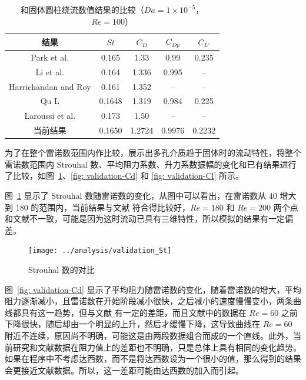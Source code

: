 \begin{table}[ht]
	\caption{和固体圆柱绕流数值结果的比较（$Da=1\times 10^{-5}$，$Re=100$）}
	\label{tab: validation}
	\vspace{.5em}\centering\wuhao
	\begin{tabular}{*{5}{c}}
		\toprule[1.5pt]
		结果 & $St$ & $C_D$ & $C_{Dp}$ & $C_{L'}$ \\
		\midrule[1pt]
		Park et al. \inlinecite{Park1998} & 0.165 & 1.33 & 0.99 & 0.235 \\
		Li et al. \inlinecite{Li2009} & 0.164 & 1.336 & 0.995 & -- \\
		Harrichandan and Roy \inlinecite{Harichandan2010} & 0.161 & 1.352 & -- & -- \\
		Qu L \inlinecite{Qu2013} & 0.1648 & 1.319 & 0.984 & 0.225 \\
		Laroussi et al. \inlinecite{Laroussi2014} & 0.173 & 1.50 & -- & -- \\
		当前结果 & 0.1650 & 1.2724 & 0.9976 & 0.2232 \\
		\bottomrule[1.5pt]
	\end{tabular}
\end{table}


为了在整个雷诺数范围内作比较，展示出多孔介质趋于固体时的流动特性，将整个雷诺数范围内 Strouhal 数、平均阻力系数、升力系数振幅的变化和已有结果进行了比较，如图~\ref{fig: validation-St}、\ref{fig: validation-Cd} 和 \ref{fig: validation-Cl} 所示。

图~\ref{fig: validation-St} 显示了 Strouhal 数随雷诺数的变化，从图中可以看出，在雷诺数从 40 增大到 180 的范围内，当前结果与文献  符合得比较好，$Re=180$ 和 $Re=200$ 两个点和文献不一致，可能是因为这时流动已具有三维特性，所以模拟的结果有一定偏差。

\begin{figure}
	\centering
	\texttt{[image: ../analysis/validation\_St]}
	\caption{Strouhal 数的对比}
	\label{fig: validation-St}
\end{figure}

图~\ref{fig: validation-Cd} 显示了平均阻力随雷诺数的变化，随着雷诺数的增大，平均阻力逐渐减小，且雷诺数在开始阶段减小很快，之后减小的速度慢慢变小，两条曲线都具有这一趋势，但与文献  有一定的差距，而且文献中的数据在 $Re=60$ 之前下降很快，随后却由一个明显的上升，然后才缓慢下降，这导致曲线在 $Re=60$ 附近不连续，原因尚不明确，可能这是由两段数据组合而成的一个直线。此外，当前研究和文献数据在阻力值上的差距也不明确，只是总体上具有相同的变化趋势。如果在程序中不考虑达西数，而不是将达西数设为一个很小的值，那么得到的结果会更接近文献数据。所以，这一差距可能由达西数的加入而引起。

